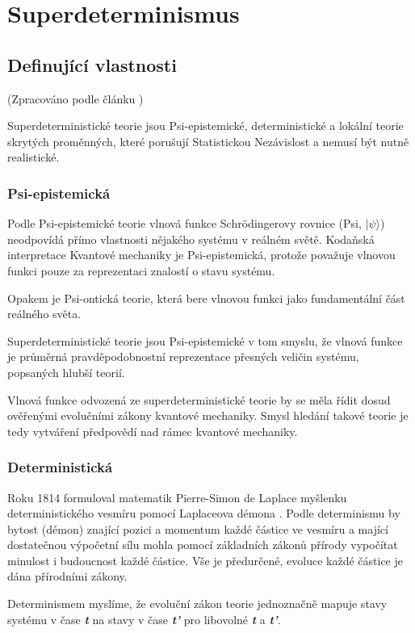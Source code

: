 \section{Superdeterminismus}
\subsection{Definující vlastnosti}
(Zpracováno podle článku \cite{supdet:rethink})

Superdeterministické teorie jsou Psi-epistemické, deterministické a lokální teorie skrytých proměnných, které porušují Statistickou Nezávislost a nemusí být nutně realistické.

\subsubsection{Psi-epistemická}
Podle Psi-epistemické teorie vlnová funkce Schrödingerovy rovnice (Psi, $|\psi\rangle$) neodpovídá přímo vlastnosti nějakého systému v reálném světě. Kodaňská interpretace Kvantové mechaniky je Psi-epistemická, protože považuje vlnovou funkci pouze za reprezentaci znalostí o stavu systému.

Opakem je Psi-ontická teorie, která bere vlnovou funkci jako fundamentální část reálného světa.

Superdeterministické teorie jsou Psi-epistemické v tom smyslu, že vlnová funkce je průměrná pravděpodobnostní reprezentace přesných veličin systému, popsaných hlubší teorií.

Vlnová funkce odvozená ze superdeterministické teorie by se měla řídit dosud ověřenými evolučními zákony kvantové mechaniky. Smysl hledání takové teorie je tedy vytváření předpovědí nad rámec kvantové mechaniky.

\subsubsection{Deterministická}
Roku 1814 formuloval matematik Pierre-Simon de Laplace myšlenku deterministického vesmíru pomocí Laplaceova démona \parencite{laplace:demon}. Podle determinismu by bytost (démon) znající pozici a momentum každé částice ve vesmíru a mající dostatečnou výpočetní sílu mohla pomocí základních zákonů přírody vypočítat minulost i budoucnost každé částice. Vše je předurčené, evoluce každé částice je dána přírodními zákony.

Determinismem myslíme, že evoluční zákon teorie jednoznačně mapuje stavy systému v čase \textbf{\emph{t}} na stavy v čase \textbf{\emph{t'}} pro libovolné \textbf{\emph{t}} a \textbf{\emph{t'}}.

